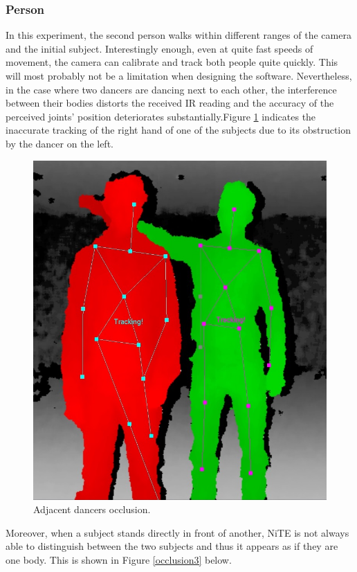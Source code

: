 \documentclass[10pt]{article}
\begin{document}
\subsubsection{Person}
\noindent
In this experiment, the second person walks within different ranges of the camera and the initial subject. Interestingly enough, even at quite fast speeds of movement, the camera can calibrate and track both people quite quickly. This will most probably not be a limitation when designing the software. Nevertheless, in the case where two dancers are dancing next to each other, the interference between their bodies distorts the received IR reading and the accuracy of the perceived joints' position deteriorates substantially.Figure \ref{occlusion1} indicates the inaccurate tracking of the right hand of one of the subjects due to its obstruction by the dancer on the left.

\begin{figure}[H]
\center
\includegraphics[scale=0.2]{Occlusion1.jpg} 
\caption{Adjacent dancers occlusion.}
\label{occlusion1}
\end{figure} 

Moreover, when a subject stands directly in front of another, NiTE is not always able to distinguish between the two subjects and thus it appears as if they are one body. This is shown in Figure \ref{occlusion3} below.
\end{document}
